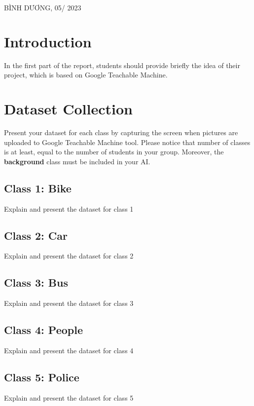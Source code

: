 \documentclass[a4paper,11pt]{article}
\theoremstyle{mytheor}
\begin{document}
\begin{titlepage}
\begin{table}[h]
\begin{tabular}{rrl}
\end{tabular}
\end{table}
\vspace{3cm}
\begin{center}
{\footnotesize BÌNH DƯƠNG, 05/ 2023}
\end{center}
\end{titlepage}

\renewcommand{\contentsname}{Content}
\newpage
\vspace{1cm}
\tableofcontents
\newpage

\section{Introduction}
    

In the first part of the report, students should provide briefly the idea of their project, which is based on Google Teachable Machine.




\section{Dataset Collection}

Present your dataset for each class by capturing the screen when pictures are uploaded to Google Teachable Machine tool. Please notice that number of classes is at least, equal to the number of students in your group. Moreover, the \textbf{background} class must be included in your AI.\\

\subsection{Class 1: Bike}
Explain and present the dataset for class 1
\subsection{Class 2: Car}
Explain and present the dataset for class 2
\subsection{Class 3: Bus}
Explain and present the dataset for class 3
\subsection{Class 4: People}
Explain and present the dataset for class 4
\subsection{Class 5: Police}
Explain and present the dataset for class 5
\end{document}
